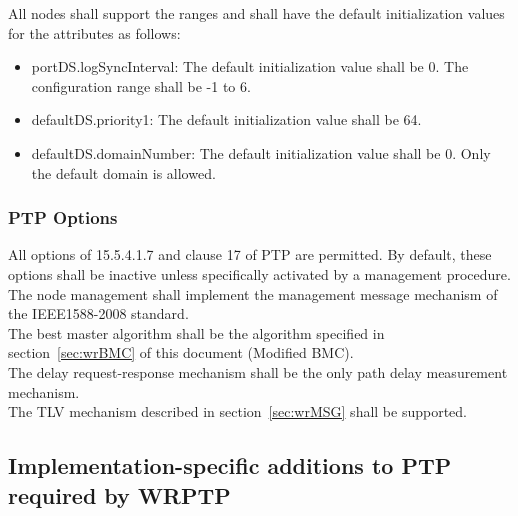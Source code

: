\documentclass[a4paper, 12pt]{article}
\begin{document}
All nodes shall support the ranges and shall have the default initialization values for 
the attributes as follows:
\begin{itemize}
  \item portDS.logSyncInterval: The default initialization value shall be 0. The configuration range
	shall be -1 to 6.
  \item defaultDS.priority1: The default initialization value shall be 64.
  \item defaultDS.domainNumber: The default initialization value shall be 0. Only the default 
	domain is allowed.
\end{itemize}

\subsubsection{PTP Options}

All options of 15.5.4.1.7 and clause 17 of PTP are permitted. By default, these options shall be 
inactive unless specifically activated by a management procedure.
\\
The node management shall implement the management message mechanism of the IEEE1588-2008 standard.
\\
The best master algorithm shall be the algorithm specified in section~\ref{sec:wrBMC} of this 
document (Modified BMC).
\\
The delay request-response mechanism shall be the only path delay measurement mechanism.
\\
The TLV mechanism described in section~\ref{sec:wrMSG} shall be supported.
\\

% 

\subsection{Implementation-specific additions to PTP required by WRPTP}
 
\end{document}

